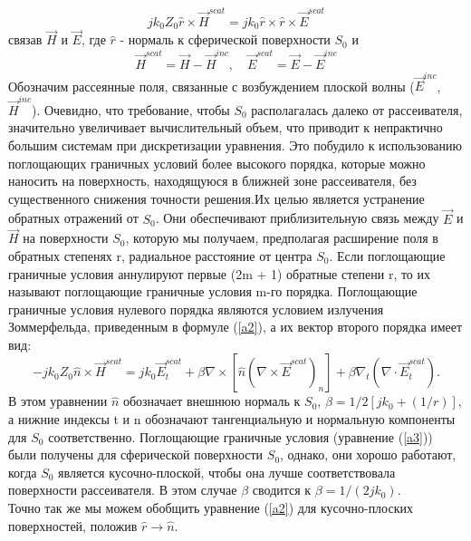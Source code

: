 \begin{equation}\label{a2}
	jk_{0}Z_{0}\hat{r} \times \vec{H}^{scat} = jk_{0}\hat{r} \times \hat{r} \times \vec{E}^{scat}
\end{equation}
		связав $ \vec{H} $ и $ \vec{E} $, где $ \hat{r} $ - нормаль к сферической поверхности $ S_{0} $ и
\begin{equation}
	\vec{H}^{scat} = \vec{H} - \vec{H}^{inc},\quad \vec{E}^{scat} = \vec{E} - \vec{E}^{inc}
\end{equation}
Обозначим рассеянные поля, связанные с возбуждением плоской волны ($ \vec{E}^{inc} $, $ \vec{H}^{inc} $).
Очевидно, что требование, чтобы $ S_{0} $ располагалась далеко от рассеивателя, значительно увеличивает вычислительный объем, что приводит к непрактично большим системам при дискретизации уравнения. Это побудило к использованию поглощающих граничных условий более высокого порядка, которые можно наносить на поверхность, находящуюся в ближней зоне рассеивателя, без существенного снижения точности решения.Их целью является устранение обратных отражений от $ S_{0} $. Они обеспечивают приблизительную связь между $\vec{E}$ и $\vec{H}$ на поверхности $ S_{0} $, которую мы получаем, предполагая расширение поля в обратных степенях r, радиальное расстояние от центра $S_{0}$. Если поглощающие граничные условия аннулируют первые (2m + 1) обратные степени r, то их называют поглощающие граничные условия m-го порядка.
Поглощающие граничные условия нулевого порядка являются условием излучения Зоммерфельда, приведенным в формуле (\ref{a2}), а их вектор второго порядка имеет вид:
\begin{equation}\label{a3}
	-jk_{0}Z_{0}\hat{n} \times \vec{H}^{scat} = jk_{0}\vec{E}_{t}^{scat} + \beta \nabla \times [\hat{n}(\nabla \times \vec{E}^{scat})_{n}] + \beta\nabla_{t} (\nabla \cdot \vec{E}_{t}^{scat}).
\end{equation}
В этом уравнении $ \hat{n} $ обозначает внешнюю нормаль к $S_{0}$, $\beta = 1/{2[jk_{0} + (1/r)]}$, а нижние индексы t и n обозначают тангенциальную и нормальную компоненты для $ S_{0} $ соответственно. 
Поглощающие граничные условия (уравнение (\ref{a3})) были получены для сферической поверхности $ S_{0} $, однако, они хорошо работают, когда $ S_{0} $ является кусочно-плоской, чтобы она лучше соответствовала поверхности рассеивателя.
В этом случае $ \beta $ сводится к $ \beta = 1/(2jk_{0}) $.\\
Точно так же мы можем обобщить уравнение (\ref{a2}) для кусочно-плоских поверхностей, положив $ \hat{r} \rightarrow \hat{n} $.\\
